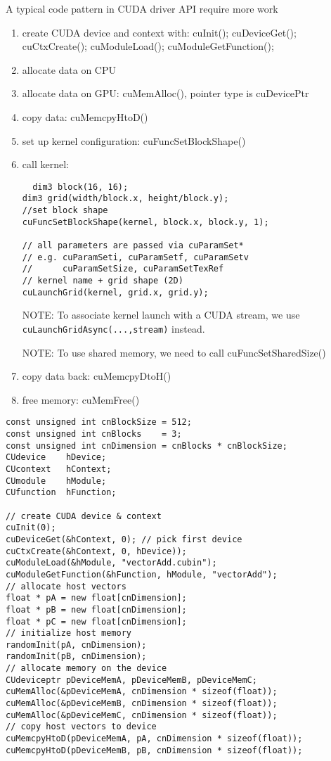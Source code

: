 A typical code pattern in CUDA driver API require more work
\begin{enumerate}
  \item create CUDA device and context with: cuInit(); cuDeviceGet();
  cuCtxCreate(); cuModuleLoad(); cuModuleGetFunction();
  \item allocate data on CPU
  \item allocate data on GPU: cuMemAlloc(), pointer type is cuDevicePtr
  \item copy data: cuMemcpyHtoD()
  \item set up kernel configuration: cuFuncSetBlockShape()
  \item call kernel:
  \begin{lstlisting}
  dim3 block(16, 16);
dim3 grid(width/block.x, height/block.y);
//set block shape
cuFuncSetBlockShape(kernel, block.x, block.y, 1);

// all parameters are passed via cuParamSet*
// e.g. cuParamSeti, cuParamSetf, cuParamSetv
//      cuParamSetSize, cuParamSetTexRef
// kernel name + grid shape (2D)
cuLaunchGrid(kernel, grid.x, grid.y);
  \end{lstlisting}
  
  NOTE: To associate kernel launch with a CUDA stream, we use
  \verb!cuLaunchGridAsync(...,stream)! instead. 
  
  NOTE: To use shared memory, we need to call cuFuncSetSharedSize()
  \item copy data back: cuMemcpyDtoH()
  \item free memory: cuMemFree()
\end{enumerate}
\begin{lstlisting}
const unsigned int cnBlockSize = 512;
const unsigned int cnBlocks    = 3;
const unsigned int cnDimension = cnBlocks * cnBlockSize;
CUdevice    hDevice;
CUcontext   hContext;
CUmodule    hModule;
CUfunction  hFunction;
    
// create CUDA device & context
cuInit(0);
cuDeviceGet(&hContext, 0); // pick first device
cuCtxCreate(&hContext, 0, hDevice));
cuModuleLoad(&hModule, "vectorAdd.cubin");
cuModuleGetFunction(&hFunction, hModule, "vectorAdd");
// allocate host vectors
float * pA = new float[cnDimension];
float * pB = new float[cnDimension];
float * pC = new float[cnDimension];
// initialize host memory
randomInit(pA, cnDimension);
randomInit(pB, cnDimension);
// allocate memory on the device 
CUdeviceptr pDeviceMemA, pDeviceMemB, pDeviceMemC;
cuMemAlloc(&pDeviceMemA, cnDimension * sizeof(float));
cuMemAlloc(&pDeviceMemB, cnDimension * sizeof(float)); 
cuMemAlloc(&pDeviceMemC, cnDimension * sizeof(float));
// copy host vectors to device
cuMemcpyHtoD(pDeviceMemA, pA, cnDimension * sizeof(float));
cuMemcpyHtoD(pDeviceMemB, pB, cnDimension * sizeof(float));
\end{lstlisting}

